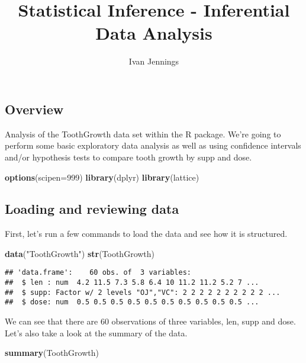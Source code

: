\documentclass[
]{article}
\title{Statistical Inference - Inferential Data Analysis}
\author{Ivan Jennings}
\date{}
\newenvironment{Shaded}{\begin{snugshade}}{\end{snugshade}}
\newcommand{\DataTypeTok}[1]{\textcolor[rgb]{0.13,0.29,0.53}{#1}}
\newcommand{\DecValTok}[1]{\textcolor[rgb]{0.00,0.00,0.81}{#1}}
\newcommand{\KeywordTok}[1]{\textcolor[rgb]{0.13,0.29,0.53}{\textbf{#1}}}
\newcommand{\NormalTok}[1]{#1}
\newcommand{\StringTok}[1]{\textcolor[rgb]{0.31,0.60,0.02}{#1}}
\begin{document}
\maketitle

\hypertarget{overview}{%
\subsection{Overview}\label{overview}}

Analysis of the ToothGrowth data set within the R package. We're going
to perform some basic exploratory data analysis as well as using
confidence intervals and/or hypothesis tests to compare tooth growth by
supp and dose.

\begin{Shaded}
\begin{Highlighting}[]
\KeywordTok{options}\NormalTok{(}\DataTypeTok{scipen=}\DecValTok{999}\NormalTok{)}
\KeywordTok{library}\NormalTok{(dplyr)}
\KeywordTok{library}\NormalTok{(lattice)}
\end{Highlighting}
\end{Shaded}

\hypertarget{loading-and-reviewing-data}{%
\subsection{Loading and reviewing
data}\label{loading-and-reviewing-data}}

First, let's run a few commands to load the data and see how it is
structured.

\begin{Shaded}
\begin{Highlighting}[]
\KeywordTok{data}\NormalTok{(}\StringTok{"ToothGrowth"}\NormalTok{)}
\KeywordTok{str}\NormalTok{(ToothGrowth)}
\end{Highlighting}
\end{Shaded}

\begin{verbatim}
## 'data.frame':    60 obs. of  3 variables:
##  $ len : num  4.2 11.5 7.3 5.8 6.4 10 11.2 11.2 5.2 7 ...
##  $ supp: Factor w/ 2 levels "OJ","VC": 2 2 2 2 2 2 2 2 2 2 ...
##  $ dose: num  0.5 0.5 0.5 0.5 0.5 0.5 0.5 0.5 0.5 0.5 ...
\end{verbatim}

We can see that there are 60 observations of three variables, len, supp
and dose. Let's also take a look at the summary of the data.

\begin{Shaded}
\begin{Highlighting}[]
\KeywordTok{summary}\NormalTok{(ToothGrowth)}
\end{Highlighting}
\end{Shaded}
\end{document}
